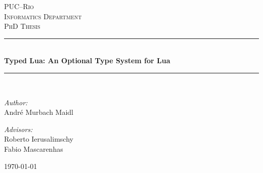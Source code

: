 \documentclass[pdftex,12pt,a4paper]{report}
\begin{document}
\begin{titlepage}
\begin{center}

\textsc{\LARGE PUC--Rio}\\[1.5cm]
\textsc{\Large Informatics Department}\\[1.0cm]
\textsc{\Large PhD Thesis}\\[0.5cm]

\newcommand{\HRule}{\rule{\linewidth}{0.5mm}}
\HRule \\[0.4cm]
{\huge \bfseries Typed Lua: An Optional Type System for Lua}\\[0.4cm]
\HRule \\[1.5cm]

\begin{minipage}{0.4\textwidth}
\begin{flushleft} \large
\emph{Author:}\\
André Murbach Maidl
\end{flushleft}
\end{minipage}
\begin{minipage}{0.4\textwidth}
\begin{flushright} \large
\emph{Advisors:} \\
Roberto Ierusalimschy \\
Fabio Mascarenhas
\end{flushright}
\end{minipage}

\vfill
{\large \today}

\end{center}
\end{titlepage}

\newpage
{}

\tableofcontents

\listoffigures
{}

\listoftables
{}



\newpage
{}
\end{document}
